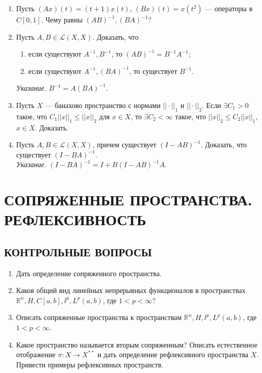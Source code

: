\documentclass[12pt,a4paper]{article}
\begin{document}
\begin{enumerate}
\item Пусть $(Ax)(t) = (t+1)x(t)$, $(Bx)(t) = x(t^{2})$ — операторы в $C[0,1]$. Чему равны $(AB)^{-1}, (BA)^{-1}$?

\item Пусть $A, B \in \mathcal{L}(X,X)$. Доказать, что
\begin{enumerate}[label=\alph*)]
\item если существуют $A^{-1}, B^{-1}$, то $(AB)^{-1} = B^{-1}A^{-1}$;
\item если существуют $A^{-1}, (BA)^{-1}$, то существует $B^{-1}$.
\end{enumerate}
\textit{Указание.} $B^{-1} = A(BA)^{-1}$.

\item Пусть $X$ — банахово пространство с нормами $|| \cdot ||_{1}$ и $|| \cdot ||_{2}$. Если $\exists C_{1} > 0$ такое, что $C_{1}||x||_{1} \le ||x||_{2}$ для $x \in X$, то $\exists C_{2} < \infty$ такое, что $||x||_{2} \le C_{2}||x||_{1}$, $x \in X$. Доказать.

\item Пусть $A, B \in \mathcal{L}(X,X)$, причем существует $(I - AB)^{-1}$. Доказать, что существует $(I - BA)^{-1}$.\\
\textit{Указание.} $(I - BA)^{-1} = I + B(I - AB)^{-1}A$.
\end{enumerate}

\section{СОПРЯЖЕННЫЕ ПРОСТРАНСТВА. РЕФЛЕКСИВНОСТЬ}

\subsection*{КОНТРОЛЬНЫЕ ВОПРОСЫ}
\begin{enumerate}
\item Дать определение сопряженного пространства.
\item Каков общий вид линейных непрерывных функционалов в пространствах $\mathbb{R}^{n}, H, C[a,b], l^{p}, L^{p}(a,b)$, где $1 < p < \infty$?
\item Описать сопряженные пространства к пространствам $\mathbb{R}^{n}, H, l^{p}, L^{p}(a,b)$, где $1 < p < \infty$.
\item Какое пространство называется вторым сопряженным? Описать естественное отображение $\pi: X \rightarrow X^{**}$ и дать определение рефлексивного пространства $X$. Привести примеры рефлексивных пространств.
\end{enumerate}
\end{document}
